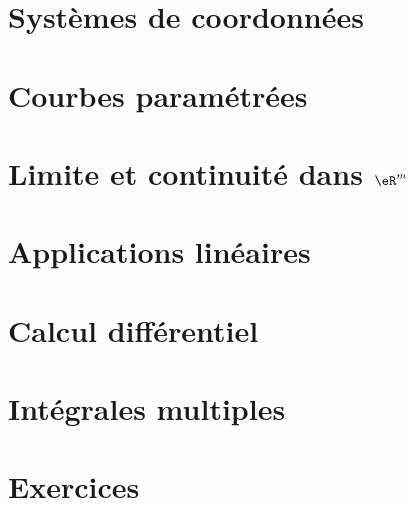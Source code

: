 \chapter{Systèmes de coordonnées}       \label{Chap_SystcoordGA}


\chapter{Courbes paramétrées}           \label{Chap_courbes}



\chapter{Limite et continuité dans $\eR^m$} \label{ChapLimContinuite}



\chapter{Applications linéaires}        \label{Chap_appl_lin}



\chapter{Calcul différentiel}           \label{ChapCalculDiff}



\chapter{Intégrales multiples}          \label{ChapMultiples}




\chapter{Exercices}             \label{Chap_exercices}







\appendix
\setcounter{chapter}{0}
\setcounter{section}{0}
\renewcommand{\theequation}{\Alph{chapter}.\arabic{equation}}
\renewcommand{\thenumtho}{\Alph{chapter}.\arabic{numtho}}
\renewcommand{\thechapter}{\Alph{chapter}}


